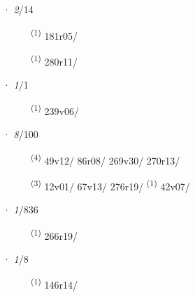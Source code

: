 \ENTRYEND
\noindent{} · \textit{2}/14 \LEMMALINE
\begin{description}
    \item[]  \textsuperscript{(1)} \mbox{181r05/}
    \item[]  \textsuperscript{(1)} \mbox{280r11/}
\end{description}
\ENTRYEND
\noindent{} · \textit{1}/1 \LEMMALINE
\begin{description}
    \item[]  \textsuperscript{(1)} \mbox{239v06/}
\end{description}
\ENTRYEND
\noindent{} · \textit{8}/100 \LEMMALINE
\begin{description}
    \item[]  \textsuperscript{(4)} \mbox{49v12/} \mbox{86r08/} \mbox{269v30/} \mbox{270r13/}
    \item[]  \textsuperscript{(3)} \mbox{12v01/} \mbox{67v13/} \mbox{276r19/} \textsuperscript{(1)} \mbox{42v07/}
\end{description}
\ENTRYEND
\noindent{} · \textit{1}/836 \LEMMALINE
\begin{description}
    \item[]  \textsuperscript{(1)} \mbox{266r19/}
\end{description}
\ENTRYEND
\noindent{} · \textit{1}/8 \LEMMALINE
\begin{description}
    \item[]  \textsuperscript{(1)} \mbox{146r14/}
\end{description}
